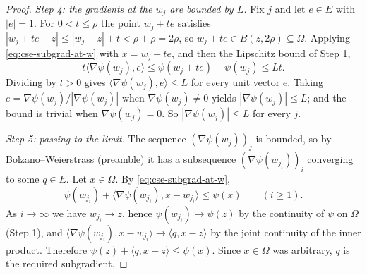 \begin{proof}
\emph{Step 4: the gradients at the $w_j$ are bounded by $L$.}
Fix $j$ and let $e\in E$ with $|e|=1$. For $0<t\le\rho$ the point $w_j+te$
satisfies $|w_j+te-z|\le|w_j-z|+t<\rho+\rho=2\rho$, so $w_j+te\in
B(z,2\rho)\subseteq\Omega$. Applying \eqref{eq:cse-subgrad-at-w} with
$x=w_j+te$, and then the Lipschitz bound of Step 1,
\[
  t\langle\nabla\psi(w_j),e\rangle\le\psi(w_j+te)-\psi(w_j)\le Lt .
\]
Dividing by $t>0$ gives $\langle\nabla\psi(w_j),e\rangle\le L$ for every unit
vector $e$. Taking $e=\nabla\psi(w_j)/|\nabla\psi(w_j)|$ when
$\nabla\psi(w_j)\ne0$ yields $|\nabla\psi(w_j)|\le L$; and the bound is trivial
when $\nabla\psi(w_j)=0$. So $|\nabla\psi(w_j)|\le L$ for every $j$.

\emph{Step 5: passing to the limit.}
The sequence $(\nabla\psi(w_j))_j$ is bounded, so by Bolzano--Weierstrass
(preamble) it has a subsequence $(\nabla\psi(w_{j_i}))_i$ converging to some
$q\in E$. Let $x\in\Omega$. By \eqref{eq:cse-subgrad-at-w},
\[
  \psi(w_{j_i})+\langle\nabla\psi(w_{j_i}),x-w_{j_i}\rangle\le\psi(x)
  \qquad(i\ge1).
\]
As $i\to\infty$ we have $w_{j_i}\to z$, hence $\psi(w_{j_i})\to\psi(z)$ by the
continuity of $\psi$ on $\Omega$ (Step 1), and
$\langle\nabla\psi(w_{j_i}),x-w_{j_i}\rangle\to\langle q,x-z\rangle$ by the
joint continuity of the inner product. Therefore
$\psi(z)+\langle q,x-z\rangle\le\psi(x)$. Since $x\in\Omega$ was arbitrary, $q$
is the required subgradient.
\end{proof}
